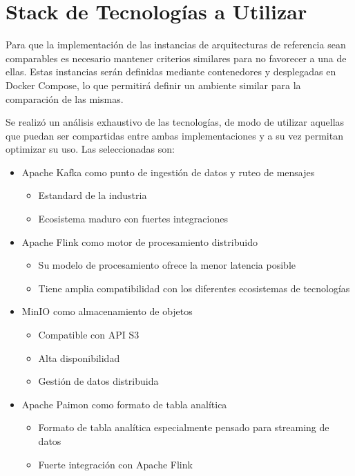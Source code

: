 \section{Stack de Tecnologías a Utilizar}

Para que la implementación de las instancias de arquitecturas de referencia sean comparables es necesario mantener criterios similares para no favorecer a una de ellas.
Estas instancias serán definidas mediante contenedores y desplegadas en Docker Compose, 
lo que permitirá definir un ambiente similar para la comparación de las mismas.

Se realizó un análisis exhaustivo de las tecnologías, de modo de utilizar aquellas que puedan ser compartidas entre ambas implementaciones y a su vez permitan
optimizar su uso. Las seleccionadas son: 

\begin{itemize}
    \item Apache Kafka como punto de ingestión de datos y ruteo de mensajes
       \begin{itemize}
           \item Estandard de la industria
           \item Ecosistema maduro con fuertes integraciones
       \end{itemize}
    \item Apache Flink como motor de procesamiento distribuido
       \begin{itemize}
           \item Su modelo de procesamiento ofrece la menor latencia posible
           \item Tiene amplia compatibilidad con los diferentes ecosistemas de tecnologías
       \end{itemize}
    \item MinIO como almacenamiento de objetos
       \begin{itemize}
           \item Compatible con API S3
           \item Alta disponibilidad
           \item Gestión de datos distribuida
       \end{itemize}
    \item Apache Paimon como formato de tabla analítica
       \begin{itemize}
           \item Formato de tabla analítica especialmente pensado para streaming de datos
           \item Fuerte integración con Apache Flink

\end{itemize}
\end{itemize}
